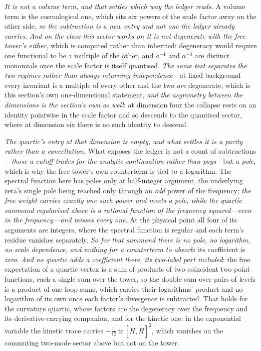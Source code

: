 \documentclass[11pt,a4paper]{article}
\theoremstyle{plain}
\theoremstyle{definition}
\theoremstyle{remark}
\begin{document}
\emph{It is not a volume term, and that settles which way the ledger reads.} A volume term is the cosmological one,
which sits six powers of the scale factor away on the other side, \emph{so the subtraction is a new entry and not
one the ledger already carries}. \emph{And on the class this sector works on it is not degenerate with the free
tower's either}, which is computed rather than inherited: degeneracy would require one functional to be a multiple
of the other, and $a^{-1}$ and $a^{-3}$ are distinct monomials once the scale factor is itself quantised. \emph{The
same test separates the two regimes rather than always returning independence}---at fixed background every
invariant is a multiple of every other and the two \emph{are} degenerate, which is this section's own
one-dimensional statement, \emph{and the asymmetry between the dimensions is the section's own as well}: at
dimension four the collapse rests on an identity pointwise in the scale factor and so descends to the quantised
sector, where at dimension six there is no such identity to
descend.

\emph{The quartic's entry at that dimension is empty, and what settles it is a parity rather than a cancellation.}
What exposes the ledger is not a count of subtractions---\emph{those a cutoff trades for the analytic continuation
rather than pays}---but a \emph{pole}, which is why the free tower's own counterterm is tied to a logarithm. The
spectral function here has poles only at half-integer argument, the underlying zeta's single pole being reached
only through an \emph{odd} power of the frequency; \emph{the free weight carries exactly one such power and meets
a pole, while the quartic summand regularised above is a rational function of the frequency \emph{squared}---even
in the frequency---and misses every one}. At the physical point all four of its arguments are integers, where the
spectral function is regular and each term's residue vanishes separately. \emph{So for that summand there is no
pole, no logarithm, no scale dependence, and nothing for a counterterm to absorb}: its coefficient is
\emph{zero}. \emph{And no quartic adds a coefficient there, its two-label part included}: the free expectation of
a quartic vertex is a sum of products of two coincident two-point functions, each a single sum over the tower, so
the double sum over pairs of levels is a product of one-loop sums, which carries their logarithms' product and no
logarithm of its own once each factor's divergence is subtracted. That holds for the curvature quartic, whose
factors are the degeneracy over the frequency and its derivative-carrying companion, and for the kinetic one: in
the exponential variable the kinetic trace carries $-\tfrac{1}{12}\,\mathrm{tr}\,[H,\dot H]^{2}$, which vanishes on
the commuting two-mode sector above but not on the tower.
\end{document}
